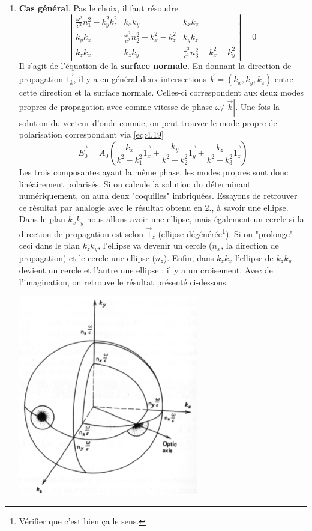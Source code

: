 \begin{enumerate}
\item \textbf{Cas général}. Pas le choix, il faut
résoudre
\begin{equation}
\left|\begin{array}{ccc}
\frac{\omega^2}{c^2}n_1^2-k_y^2k_z^2 & k_xk_y & k_xk_z\\
k_yk_x & \frac{\omega^2}{c^2}n_2^2-k_x^2-k_z^2 & k_yk_z\\
k_zk_x & k_zk_y & \frac{\omega^2}{c^2}n_3^2-k_x^2-k_y^2
\end{array}\right|=0
\end{equation}
Il s'agit de l'équation de la \textbf{surface normale}. En donnant la direction de propagation $\vec{1_k}$, il
y a en général deux intersections $\vec k=(k_x,k_y,k_z)$ entre cette direction et la surface normale. Celles-ci 
correspondent aux deux modes propres de propagation avec comme vitesse de phase $\omega/|\vec{k}|$. Une fois
la solution du vecteur d'onde connue, on peut trouver le mode propre de polarisation correspondant via
\eqref{eq:4.19}
\begin{equation}
\vec{E_0} = A_0\left(\dfrac{k_x}{k^2-k^2_1}\vec{1_x}+\dfrac{k_y}{k^2-k^2_2}\vec{1_y}+
\dfrac{k_z}{k^2-k^2_3}\vec{1_z}\right)
\end{equation}
Les trois composantes ayant la même phase, les modes propres sont donc linéairement polarisés. Si on 
calcule la solution du déterminant numériquement, on aura deux "coquilles" imbriquées. Essayons de 
retrouver ce résultat par analogie avec le résultat obtenu en 2., à savoir une ellipse. \\

Dans le plan $k_xk_y$ nous allons avoir une ellipse, mais également un cercle si la direction de propagation
est selon $\vec 1_z$ (ellipse dégénérée\footnote{Vérifier que c'est bien ça le sens.}). Si on "prolonge" ceci
dans le plan $k_zk_y$, l'ellipse va devenir un cercle ($n_x$, la direction de propagation) et le cercle une
ellipse ($n_z$). Enfin, dans $k_zk_x$ l'ellipse de $k_zk_y$ devient un cercle et l'autre une ellipse : il y
a un croisement. Avec de l'imagination, on retrouve le résultat présenté ci-dessous.
\begin{center}
	\includegraphics[scale=0.54]{ch4/image2.png}
\end{center}


\end{enumerate}
